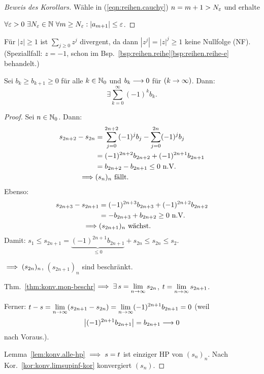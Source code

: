 \documentclass[12pt]{scrreprt}
\begin{document}
\begin{proof}[Beweis des Korollars] Wähle in (\ref{eqn:reihen.cauchy}) $n=m+1>N_\varepsilon$ und erhalte

$\forall\ep > 0\ \exists \nat{N_\ep}\ \forall m\geq N_\ep: \abs{a_{m+1}}\leq\ep$.
\end{proof}

\begin{bsp}
  \label{bsp:reihen.konv-nf}
  Für $|z|\geq 1$ ist $\sum_{j\geq 0}z^j$ divergent, da dann $|z^j|=|z|^j\geq 1$ keine Nullfolge (NF). (Speziallfall: $z=-1$, schon im Bsp.~\ref{bsp:reihen.reihe}\ref{bsp:reihen.reihe-e} behandelt.)
\end{bsp}

\begin{satz}
  \label{satz:reihen.leibniz}
  Sei $b_k\geq b_{k+1}\geq 0$ für alle $k\in\mathbb{N}_0$ und $b_k\longrightarrow 0$ für $(k\rightarrow\infty)$. Dann:
  \[\exists\sum^\infty_{k=0}(-1)^k b_k.\]
\end{satz}

\begin{proof}
Sei $n\in\mathbb{N}_0$. Dann:
\begin{align*}
s_{2n+2}-s_{2n} &=\sum^{2n+2}_{j=0}(-1)^j b_j -\sum^{2n}_{j=0}(-1)^j b_j\\
&=(-1)^{2n+2}b_{2n+2}+(-1)^{2n+1}b_{2n+1}\\
&=b_{2n+2}-b_{2n+1}\leq 0\ \text{n.V.}\\
\implies& (s_n)_n\ \text{fällt.}
\end{align*}
Ebenso:
\begin{align*}
s_{2n+3}-s_{2n+1} &= (-1)^{2n+3}b_{2n+3}+(-1)^{2n+2}b_{2n+2}\\
&=-b_{2n+3}+b_{2n+2}\geq 0\ \text{n.V.}\\
\implies&(s_{2n+1})_n\ \text{wächst.}
\end{align*}
Damit: $s_1 \leq s_{2n+1} = \underbrace{(-1)^{2n+1}b_{2n+1}}_{\leq 0} + s_{2n} \leq s_{2n} \leq s_2$.

$\implies (s_{2n})_n$, $(s_{2n+1})_n$ sind beschränkt.

Thm.~\ref{thm:konv.mon-beschr}$\implies\exists\,s=\displaystyle\lim_{n\to\infty}s_{2n}$, $t=\displaystyle\lim_{n\to\infty}s_{2n+1}$.

\noindent Ferner: $t-s = \displaystyle\lim_{n\to\infty}(s_{2n+1}-s_{2n}) = \displaystyle\lim_{n\to\infty}(-1)^{2n+1}b_{2n+1}=0$ (weil \[\left\lvert(-1)^{2n+1}b_{2n+1}\right\lvert = b_{2n+1}\longrightarrow 0\] nach Voraus.).

Lemma~\ref{lem:konv.alle-hp} $\implies s=t$ ist einziger HP von $(s_n)_n$. Nach Kor.~\ref{kor:konv.limsupinf-kor} konvergiert $(s_n)$.
\end{proof}
\end{document}
